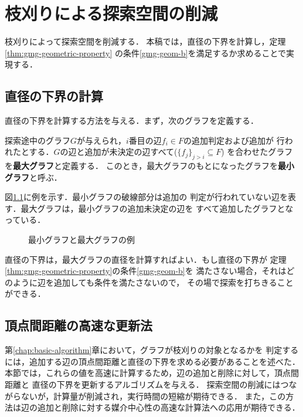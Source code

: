 
\chapter{枝刈りによる探索空間の削減}
\label{chap:reduce-by-prune}
枝刈りによって探索空間を削減する．
本稿では，直径の下界を計算し，定理\ref{thm:gmg-geometric-property}
の条件\ref{gmg-geom-b}を満足するか求めることで実現する．

\section{直径の下界の計算}
\label{sect:distance-lower-bound}
直径の下界を計算する方法を与える．まず，次のグラフを定義する．
\begin{definition}
  探索途中のグラフ$G$が与えられ，$i$番目の辺$f_i\in F$の追加判定および追加が
  行われたとする．$G$の辺と追加が未決定の辺すべて($\{f_j\}_{j>i}\subseteq F$)
  を合わせたグラフを\textbf{最大グラフ}と定義する．
  このとき，最大グラフのもとになったグラフを\textbf{最小グラフ}と呼ぶ．
\end{definition}
\begin{example}
  図\ref{fig:min-max-graph}に例を示す．最小グラフの破線部分は追加の
  判定が行われていない辺を表す．最大グラフは，最小グラフの追加未決定の辺を
  すべて追加したグラフとなっている．
\end{example}
\begin{figure}
  \centering
  \hfill
  \caption{最小グラフと最大グラフの例}
  \label{fig:min-max-graph}
\end{figure}

直径の下界は，最大グラフの直径を計算すればよい．もし直径の下界が
定理\ref{thm:gmg-geometric-property}の条件\ref{gmg-geom-b}を
満たさない場合，それはどのように辺を追加しても条件を満たさないので，
その場で探索を打ちきることができる．

\section{頂点間距離の高速な更新法}
\label{sect:faster-min-max}
第\ref{chap:basic-algorithm}章において，グラフが枝刈りの対象となるかを
判定するには，追加する辺の頂点間距離と直径の下界を求める必要があることを述べた．
本節では，これらの値を高速に計算するため，辺の追加と削除に対して，頂点間距離と
直径の下界を更新するアルゴリズムを与える．
探索空間の削減にはつながらないが，計算量が削減され，実行時間の短縮が期待できる．
また，この方法は辺の追加と削除に対する媒介中心性の高速な計算法への応用が期待できる．

